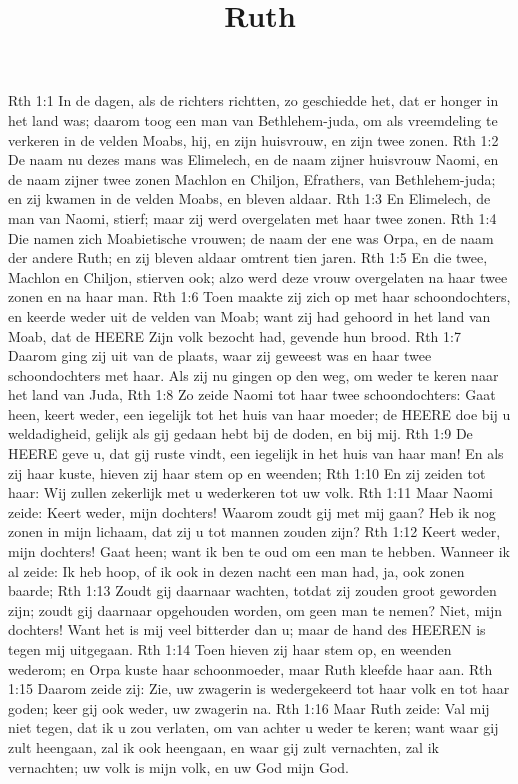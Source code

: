 

\title{Ruth}


Rth 1:1  In de dagen, als de richters richtten, zo geschiedde het, dat er honger in het land was; daarom toog een man van Bethlehem-juda, om als vreemdeling te verkeren in de velden Moabs, hij, en zijn huisvrouw, en zijn twee zonen.
Rth 1:2  De naam nu dezes mans was Elimelech, en de naam zijner huisvrouw Naomi, en de naam zijner twee zonen Machlon en Chiljon, Efrathers, van Bethlehem-juda; en zij kwamen in de velden Moabs, en bleven aldaar.
Rth 1:3  En Elimelech, de man van Naomi, stierf; maar zij werd overgelaten met haar twee zonen.
Rth 1:4  Die namen zich Moabietische vrouwen; de naam der ene was Orpa, en de naam der andere Ruth; en zij bleven aldaar omtrent tien jaren.
Rth 1:5  En die twee, Machlon en Chiljon, stierven ook; alzo werd deze vrouw overgelaten na haar twee zonen en na haar man.
Rth 1:6  Toen maakte zij zich op met haar schoondochters, en keerde weder uit de velden van Moab; want zij had gehoord in het land van Moab, dat de HEERE Zijn volk bezocht had, gevende hun brood.
Rth 1:7  Daarom ging zij uit van de plaats, waar zij geweest was en haar twee schoondochters met haar. Als zij nu gingen op den weg, om weder te keren naar het land van Juda,
Rth 1:8  Zo zeide Naomi tot haar twee schoondochters: Gaat heen, keert weder, een iegelijk tot het huis van haar moeder; de HEERE doe bij u weldadigheid, gelijk als gij gedaan hebt bij de doden, en bij mij.
Rth 1:9  De HEERE geve u, dat gij ruste vindt, een iegelijk in het huis van haar man! En als zij haar kuste, hieven zij haar stem op en weenden;
Rth 1:10  En zij zeiden tot haar: Wij zullen zekerlijk met u wederkeren tot uw volk.
Rth 1:11  Maar Naomi zeide: Keert weder, mijn dochters! Waarom zoudt gij met mij gaan? Heb ik nog zonen in mijn lichaam, dat zij u tot mannen zouden zijn?
Rth 1:12  Keert weder, mijn dochters! Gaat heen; want ik ben te oud om een man te hebben. Wanneer ik al zeide: Ik heb hoop, of ik ook in dezen nacht een man had, ja, ook zonen baarde;
Rth 1:13  Zoudt gij daarnaar wachten, totdat zij zouden groot geworden zijn; zoudt gij daarnaar opgehouden worden, om geen man te nemen? Niet, mijn dochters! Want het is mij veel bitterder dan u; maar de hand des HEEREN is tegen mij uitgegaan.
Rth 1:14  Toen hieven zij haar stem op, en weenden wederom; en Orpa kuste haar schoonmoeder, maar Ruth kleefde haar aan.
Rth 1:15  Daarom zeide zij: Zie, uw zwagerin is wedergekeerd tot haar volk en tot haar goden; keer gij ook weder, uw zwagerin na.
Rth 1:16  Maar Ruth zeide: Val mij niet tegen, dat ik u zou verlaten, om van achter u weder te keren; want waar gij zult heengaan, zal ik ook heengaan, en waar gij zult vernachten, zal ik vernachten; uw volk is mijn volk, en uw God mijn God.
